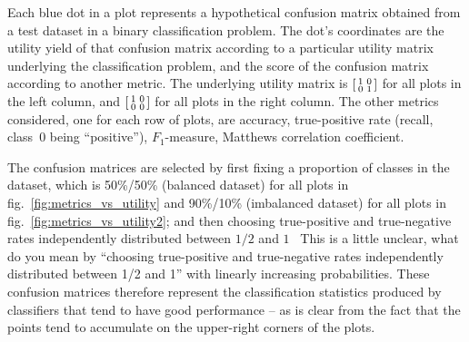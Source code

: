 \documentclass[\ifafour a4paper,12pt,\else a5paper,10pt,\fi%
onecolumn,oneside,article,%
british%
]{memoir}
\theoremstyle{remark}
\theoremstyle{innote}
\newcommand*{\wrench}{{\fontencoding{U}\fontfamily{fontawesomethree}\selectfont\symbol{114}}}
\newcommand{\mynotew}[1]{{\footnotesize\color{notecolour}\wrench\ #1}}
\renewcommand*{\|}[1][]{\nonscript\:#1\vert\nonscript\:\mathopen{}}
\newcommand*{\fig}{fig.}%
\begin{document}
Each blue dot in a plot represents a hypothetical confusion matrix obtained from a test dataset in a binary classification problem. The dot's coordinates are the utility yield of that confusion matrix according to a particular utility matrix underlying the classification problem, and the score of the confusion matrix according to another metric. The underlying utility matrix is $\begin{bsmallmatrix} 1&0\\0&1 \end{bsmallmatrix}$ for all plots in the left column, and $\begin{bsmallmatrix} 1&0\\0&0 \end{bsmallmatrix}$ for all plots in the right column. The other metrics considered, one for each row of plots, are accuracy, true-positive rate (recall, class~0 being \enquote{positive}), $F_{1}$-measure, Matthews correlation coefficient.

The confusion matrices are selected by first fixing a proportion of classes in the dataset, which is 50\%/50\% (balanced dataset) for all plots in \fig~\ref{fig:metrics_vs_utility} and 90\%/10\% (imbalanced dataset) for all plots in \fig~\ref{fig:metrics_vs_utility2}; and then choosing true-positive and true-negative rates independently distributed between $1/2$ and $1$ \mynotew{This is a little unclear, what do you mean by \enquote{choosing true-positive and true-negative rates independently
distributed between 1/2 and 1} } with linearly increasing probabilities. These confusion matrices therefore represent the classification statistics produced %
by classifiers that tend to have good performance -- as is clear from the fact that the points tend to accumulate on the upper-right corners of the plots.
\end{document}
